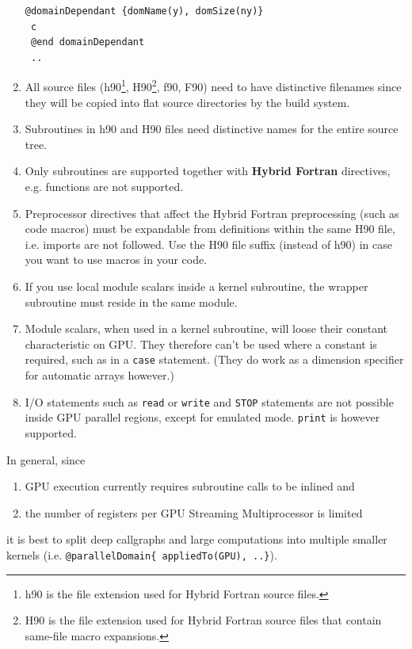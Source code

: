 \begin{enumerate}
\begin{lstlisting}[name=exampleMixedNotOK, label=listing:exampleMixedNotOK, caption={This is not ok.}]
 @domainDependant {domName(y), domSize(ny)}
 c
 @end domainDependant
 ..
 \end{lstlisting}
 \item All source files (h90\footnote{h90 is the file extension used for Hybrid Fortran source files.}, H90\footnote{H90 is the file extension used for Hybrid Fortran source files that contain same-file macro expansions.}, f90, F90) need to have distinctive filenames since they will be copied into flat source directories by the build system.
 \item Subroutines in h90 and H90 files need distinctive names for the entire source tree.
 \item Only subroutines are supported together with \textbf{Hybrid Fortran} directives, e.g. functions are not supported.
 \item Preprocessor directives that affect the Hybrid Fortran preprocessing (such as code macros) must be expandable from definitions within the same H90 file, i.e. imports are not followed. Use the H90 file suffix (instead of h90) in case you want to use macros in your code.
 \item If you use local module scalars inside a kernel subroutine, the wrapper subroutine must reside in the same module.
 \item Module scalars, when used in a kernel subroutine, will loose their constant characteristic on GPU. They therefore can't be used where a constant is required, such as in a \verb|case| statement. (They do work as a dimension specifier for automatic arrays however.)
 \item I/O statements such as \verb|read| or \verb|write| and \verb|STOP| statements are not possible inside GPU parallel regions, except for emulated mode. \verb|print| is however supported.
\end{enumerate}

In general, since
\begin{enumerate}
  \item GPU execution currently requires subroutine calls to be inlined and
  \item the number of registers per GPU Streaming Multiprocessor is limited
\end{enumerate}
it is best to split deep callgraphs and large computations into multiple smaller kernels (i.e. \verb|@parallelDomain{ appliedTo(GPU), ..}|).

\clearpage
